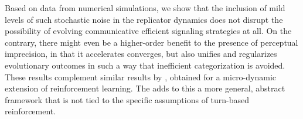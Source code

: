 Based on data from numerical simulations, we show that the inclusion
of mild levels of such stochastic noise in the replicator dynamics
does not disrupt the possibility of evolving communicative efficient
signaling strategies at all. On the contrary, there might even be a
higher-order benefit to the presence of perceptual imprecision, in
that it accelerates converges, but also unifies and regularizes
evolutionary outcomes in such a way that inefficient categorization is
avoided. These results complement similar results by
\citet{OConnor2013:The-Evolution-o}, obtained for a micro-dynamic
extension of reinforcement learning. The \rdd adds to this a more
general, abstract framework that is not tied to the specific
assumptions of turn-based reinforcement. 





